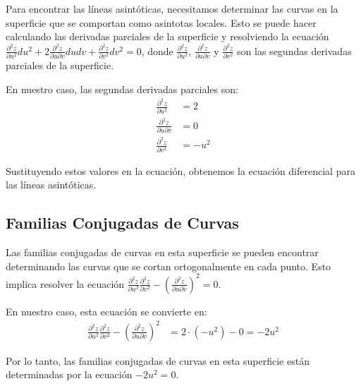 \documentclass{article}
\begin{document}
	Para encontrar las líneas asintóticas, necesitamos determinar las curvas en la superficie que se comportan como asintotas locales. Esto se puede hacer calculando las derivadas parciales de la superficie y resolviendo la ecuación $\frac{\partial^2 z}{\partial u^2} du^2 + 2\frac{\partial^2 z}{\partial u \partial v} du dv + \frac{\partial^2 z}{\partial v^2} dv^2 = 0$, donde $\frac{\partial^2 z}{\partial u^2}$, $\frac{\partial^2 z}{\partial u \partial v}$ y $\frac{\partial^2 z}{\partial v^2}$ son las segundas derivadas parciales de la superficie.
	
	En nuestro caso, las segundas derivadas parciales son:
	\begin{align*}
		\frac{\partial^2 z}{\partial u^2} &= 2 \\
		\frac{\partial^2 z}{\partial u \partial v} &= 0 \\
		\frac{\partial^2 z}{\partial v^2} &= -u^2
	\end{align*}
	
	Sustituyendo estos valores en la ecuación, obtenemos la ecuación diferencial para las líneas asintóticas.
	
	\subsection{Familias Conjugadas de Curvas}
	
	Las familias conjugadas de curvas en esta superficie se pueden encontrar determinando las curvas que se cortan ortogonalmente en cada punto. Esto implica resolver la ecuación $\frac{\partial^2 z}{\partial u^2} \frac{\partial^2 z}{\partial v^2} - \left(\frac{\partial^2 z}{\partial u \partial v}\right)^2 = 0$.
	
	En nuestro caso, esta ecuación se convierte en:
	\begin{align*}
		\frac{\partial^2 z}{\partial u^2} \frac{\partial^2 z}{\partial v^2} - \left(\frac{\partial^2 z}{\partial u \partial v}\right)^2 &= 2 \cdot (-u^2) - 0 = -2u^2
	\end{align*}
	
	Por lo tanto, las familias conjugadas de curvas en esta superficie están determinadas por la ecuación $-2u^2 = 0$.
	
\end{document}
